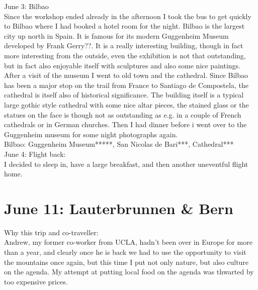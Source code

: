 June 3: Bilbao\\
Since the workshop ended already in the afternoon I took the bus to get quickly to Bilbao where I had booked a hotel room for the night. Bilbao is the largest city up north in Spain. It is famous for its modern Guggenheim Museum developed by Frank Gerry??. It is a really interesting building, though in fact more interesting from the outside, even the exhibition is not that outstanding, but in fact also enjoyable itself with sculptures and also some nice paintings. After a visit of the museum I went to old town and the cathedral. Since Bilbao has been a major stop on the trail from France to Santiago de Compostela, the cathedral is itself also of historical significance. The building itself is a typical large gothic style cathedral with some nice altar pieces, the stained glass or the statues on the face is though not as outstanding as e.g. in a couple of French cathedrals or in German churches. Then I had dinner before i went over to the Guggenheim museum for some night photographs again.\\

Bilbao: Guggenheim Museum*****, San Nicolas de Bari***, Cathedral***\\

June 4: Flight back:\\
I decided to sleep in, have a large breakfast, and then another uneventful flight home.

\section{June 11: Lauterbrunnen \& Bern}
\label{LauterbrunnenBern2016}

Why this trip and co-traveller:\\
Andrew, my former co-worker from UCLA, hadn't been over in Europe for more than a year, and clearly once he is back we had to use the opportunity to visit the mountains once again, but this time I put not only nature, but also culture on the agenda. My attempt at putting local food on the agenda was thwarted by too expensive prices.\\

